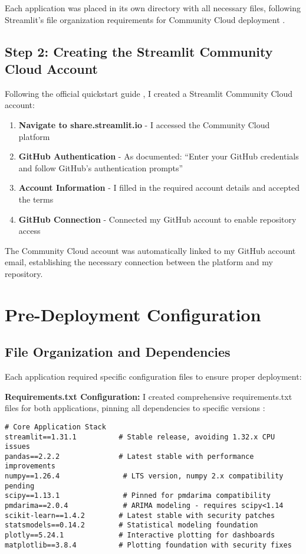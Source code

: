 Each application was placed in its own directory with all necessary files, following Streamlit's file organization requirements for Community Cloud deployment \cite{Streamlit:2024fileorg}.

\subsection{Step 2: Creating the Streamlit Community Cloud Account}

Following the official quickstart guide \cite{Streamlit:2024quickstart}, I created a Streamlit Community Cloud account:

\begin{enumerate}
\item \textbf{Navigate to share.streamlit.io} - I accessed the Community Cloud platform
\item \textbf{GitHub Authentication} - As documented: ``Enter your GitHub credentials and follow GitHub's authentication prompts'' \cite{Streamlit:2024quickstart}
\item \textbf{Account Information} - I filled in the required account details and accepted the terms
\item \textbf{GitHub Connection} - Connected my GitHub account to enable repository access
\end{enumerate}

The Community Cloud account was automatically linked to my GitHub account email, establishing the necessary connection between the platform and my repository.

\section{Pre-Deployment Configuration}

\subsection{File Organization and Dependencies}

Each application required specific configuration files to ensure proper deployment:

\textbf{Requirements.txt Configuration:}
I created comprehensive requirements.txt files for both applications, pinning all dependencies to specific versions \cite{Streamlit:2024dependencies}:

\begin{verbatim}
# Core Application Stack
streamlit==1.31.1          # Stable release, avoiding 1.32.x CPU issues
pandas==2.2.2              # Latest stable with performance improvements
numpy==1.26.4               # LTS version, numpy 2.x compatibility pending
scipy==1.13.1               # Pinned for pmdarima compatibility
pmdarima==2.0.4             # ARIMA modeling - requires scipy<1.14
scikit-learn==1.4.2        # Latest stable with security patches
statsmodels==0.14.2        # Statistical modeling foundation
plotly==5.24.1             # Interactive plotting for dashboards
matplotlib==3.8.4          # Plotting foundation with security fixes
\end{verbatim}

